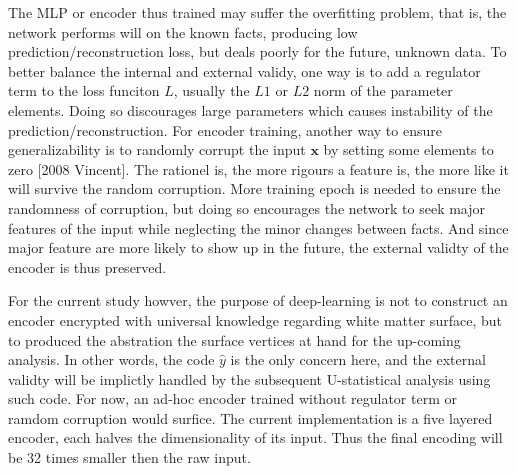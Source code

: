 The MLP or encoder thus trained may suffer the overfitting problem, that is, the network performs will on the known facts, producing low prediction/reconstruction loss, but deals poorly for the future, unknown data. To better balance the internal and external validy, one way is to add a regulator term to the loss funciton $L$, usually the $L1$ or $L2$ norm of the parameter elements. Doing so discourages large parameters which causes instability of the prediction/reconstruction. For encoder training, another way to ensure generalizability is to randomly corrupt the input $\boldsymbol{x}$ by setting some elements to zero [2008 Vincent]. The rationel is, the more rigours a feature is, the more like it will survive the random corruption. More training epoch is needed to ensure the randomness of corruption, but doing so encourages the network to seek major features of the input while neglecting the minor changes between facts. And since major feature are more likely to show up in the future, the external validty of the encoder is thus preserved.

For the current study howver, the purpose of deep-learning is not to construct an encoder encrypted with universal knowledge regarding white matter surface, but to produced the abstration the surface vertices at hand for the up-coming analysis. In other words, the code $\hat{y}$ is the only concern here, and the external validty will be implictly handled by the subsequent U-statistical analysis using such code. For now, an ad-hoc encoder trained without regulator term or ramdom corruption would surfice. The current implementation is a five layered encoder, each halves the dimensionality of its input. Thus the final encoding will be 32 times smaller then the raw input.
